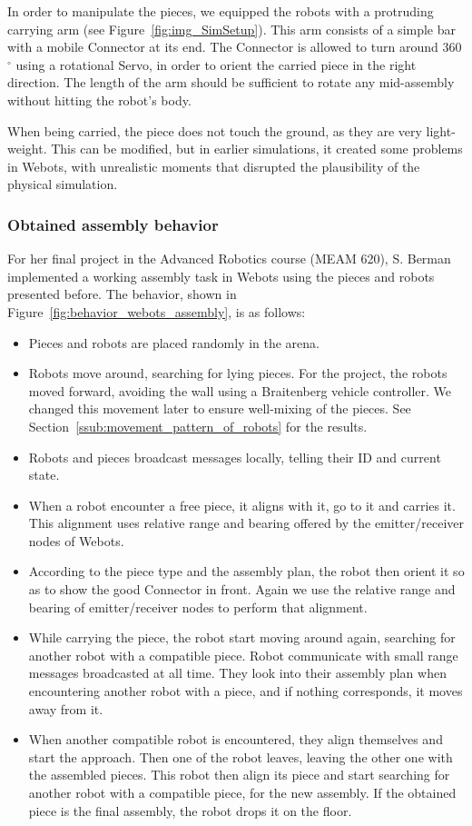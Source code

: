 \documentclass[letterpaper, oneside]{article}
\begin{document}
In order to manipulate the pieces, we equipped the robots with a protruding carrying arm (see Figure~\ref{fig:img_SimSetup}). This arm consists of a simple bar with a mobile Connector at its end. The Connector is allowed to turn around 360$^{\circ}$ using a rotational Servo, in order to orient the carried piece in the right direction. The length of the arm should be sufficient to rotate any mid-assembly without hitting the robot's body.

When being carried, the piece does not touch the ground, as they are very light-weight. This can be modified, but in earlier simulations, it created some problems in Webots, with unrealistic moments that disrupted the plausibility of the physical simulation.

\subsubsection{Obtained assembly behavior} %
\label{ssub:obtained_assembly_behavior}
For her final project in the Advanced Robotics course (MEAM 620), S. Berman implemented a working assembly task in Webots using the pieces and robots presented before. The behavior, shown in Figure~\ref{fig:behavior_webots_assembly}, is as follows:

\begin{itemize}
	\item Pieces and robots are placed randomly in the arena.
	\item Robots move around, searching for lying pieces. For the project, the robots moved forward, avoiding the wall using a Braitenberg vehicle controller. We changed this movement later to ensure well-mixing of the pieces. See Section~\ref{ssub:movement_pattern_of_robots} for the results.
	\item Robots and pieces broadcast messages locally, telling their ID and current state.
	\item When a robot encounter a free piece, it aligns with it, go to it and carries it. This alignment uses relative range and bearing offered by the emitter/receiver nodes of Webots.
	\item According to the piece type and the assembly plan, the robot then orient it so as to show the good Connector in front. Again we use the relative range and bearing of emitter/receiver nodes to perform that alignment.
	\item While carrying the piece, the robot start moving around again, searching for another robot with a compatible piece. Robot communicate with small range messages broadcasted at all time. They look into their assembly plan when encountering another robot with a piece, and if nothing corresponds, it moves away from it.
	\item When another compatible robot is encountered, they align themselves and start the approach. Then one of the robot leaves, leaving the other one with the assembled pieces. This robot then align its piece and start searching for another robot with a compatible piece, for the new assembly. If the obtained piece is the final assembly, the robot drops it on the floor.
\end{itemize}
\end{document}
